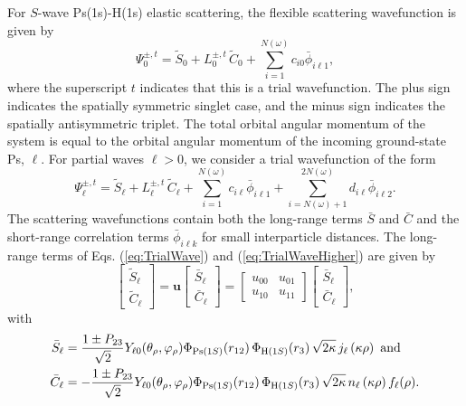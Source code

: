 \documentclass[preprint,showpacs,showkeys,preprintnumbers,amsmath,amssymb,longbibliography,pra,aps]{revtex4-1}
\begin{document}
For $S$-wave Ps(1s)-H(1s) elastic scattering, the flexible scattering
wavefunction is given by
\begin{equation}
\Psi_0^{\pm,t} = \widetilde{S}_0 + L_0^{\pm,t} \, \widetilde{C}_0
  + \sum_{i=1}^{N(\omega)} c_{i0} \bar{\phi}_{i\ell 1},
\label{eq:TrialWave}
\end{equation}
where the superscript $t$ indicates that this is a trial wavefunction. The plus
sign indicates the spatially symmetric singlet case, and the minus sign
indicates the spatially antisymmetric triplet. The total orbital angular
momentum of the system is equal to the orbital angular momentum of the incoming
ground-state Ps, $\ell$. For partial waves $\ell > 0$, we consider a trial
wavefunction of the form
\begin{equation}
\Psi_\ell^{\pm,t} = \widetilde{S}_\ell + L^{\pm,t}_\ell \, \widetilde{C}_\ell
 + \sum_{i=1}^{N(\omega)} c_{i\ell} \bar{\phi}_{i\ell 1}
 + \!\!\!\sum_{i=N(\omega)+1}^{2N(\omega)} \!\! d_{i\ell} \bar{\phi}_{i\ell 2}.
\label{eq:TrialWaveHigher}
\end{equation}
The scattering wavefunctions contain both the long-range terms $\bar{S}$ and
$\bar{C}$ and the short-range correlation terms $\bar{\phi}_{i\ell k}$ for
small interparticle distances. The 
long-range terms of Eqs. (\ref{eq:TrialWave}) and (\ref{eq:TrialWaveHigher})
are given by
\begin{equation}
\label{eq:SCPhiDef}
\begin{bmatrix}
\widetilde{S}_\ell \\ \widetilde{C}_\ell
\end{bmatrix} = \textbf{u}  \begin{bmatrix}
\bar{S}_\ell \\ \bar{C}_\ell
\end{bmatrix} = \begin{bmatrix}
u_{00} & u_{01} \\  u_{10} & u_{11}
\end{bmatrix}
\begin{bmatrix}
\bar{S}_\ell \\ \bar{C}_\ell
\end{bmatrix}, 
\end{equation}
with
\begin{subequations}
\label{eq:SCBarPhiDef}
\begin{align}
\bar{S}_\ell &= \frac{1\pm P_{23}}{\sqrt{2}}Y_{\ell 0}(\theta_\rho,
  \varphi_\rho)\Phi_{{\rm{Ps}}(1S)}\!\left(r_{12}\right) \Phi_{{\rm{H}}(1S)}\!\left(r_3\right)
  \sqrt{2\kappa} \,j_\ell\left(\kappa\rho\right) \text{ and} \label{eq:SBar} \\
\bar{C}_\ell &= -\frac{1\pm P_{23}}{\sqrt{2}}Y_{\ell 0}(\theta_\rho,
  \varphi_\rho)\Phi_{{\rm{Ps}}(1S)}\!\left(r_{12}\right) \Phi_{{\rm{H}}(1S)}\!\left(r_3\right)
  \sqrt{2\kappa} \,n_\ell\left(\kappa\rho\right) f_\ell(\rho). \label{eq:CBar}
\end{align}
\end{subequations}
\end{document}
